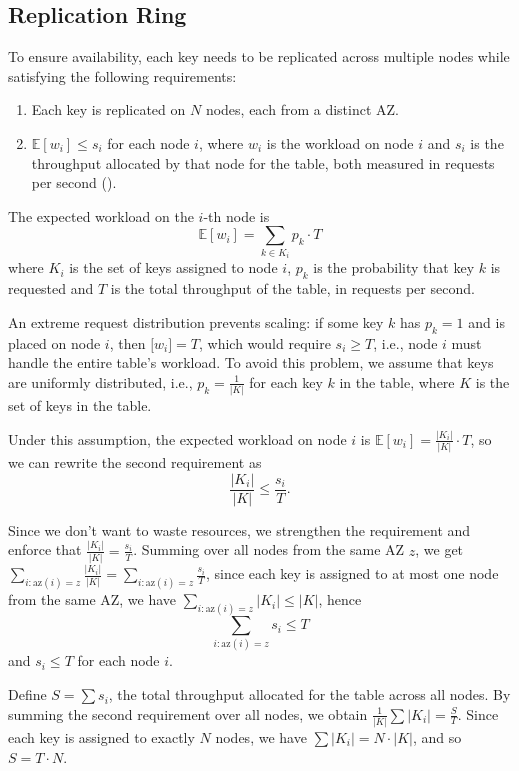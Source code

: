 \subsection{Replication Ring}
\label{subsec:replication-ring}

To ensure availability, each key needs to be replicated across multiple nodes
while satisfying the following requirements:

\begin{enumerate}
    \item Each key is replicated on $N$ nodes, each from a distinct AZ.
    \item $\mathbb{E}[w_i] \leq s_i$ for each node $i$, where $w_i$ is the
        workload on node $i$ and $s_i$ is the throughput allocated by that node
        for the table, both measured in requests per second (\unit{\rps}).
\end{enumerate}

The expected workload on the $i$-th node is
\[
    \mathbb{E}[w_i] = \sum_{k \in K_i} p_k \cdot T
\]
where $K_i$ is the set of keys assigned to node $i$, $p_k$ is the
probability that key $k$ is requested and $T$ is the total throughput of the
table, in requests per second.

An extreme request distribution prevents scaling: if some key $k$ has $p_k = 1$
and is placed on node $i$, then $\mathbb[w_i] = T$, which would require
$s_i \geq T$, i.e., node $i$ must handle the entire table's workload.
To avoid this problem, we assume that keys are uniformly distributed, i.e.,
$p_k = \frac{1}{|K|}$ for each key $k$ in the table, where $K$ is the set of
keys in the table.

Under this assumption, the expected workload on node $i$ is
$\mathbb{E}[w_i] = \frac{|K_i|}{|K|} \cdot T$, so we can rewrite the second
requirement as
\[
    \frac{|K_i|}{|K|} \leq \frac{s_i}{T}.
\]

Since we don't want to waste resources, we strengthen the requirement and
enforce that $\frac{|K_i|}{|K|} = \frac{s_i}{T}$.
Summing over all nodes from the same AZ $z$, we get $\sum_{i :
\mathrm{az}(i) = z} \frac{|K_i|}{|K|} = \sum_{i : \mathrm{az}(i) = z}
\frac{s_i}{T}$, since each key is assigned to at most one node from the same
AZ, we have $\sum_{i : \mathrm{az}(i) = z} |K_i| \leq |K|$, hence
\[
    \sum_{i : \mathrm{az}(i) = z} s_i \leq T
\]
and $s_i \leq T$ for each node $i$.

Define $S = \sum s_i$, the total throughput allocated for the table across all
nodes.
By summing the second requirement over all nodes, we obtain $\frac{1}{|K|} \sum
|K_i| = \frac{S}{T}$.
Since each key is assigned to exactly $N$ nodes, we have $\sum |K_i| = N
\cdot |K|$, and so $S = T \cdot N$.

